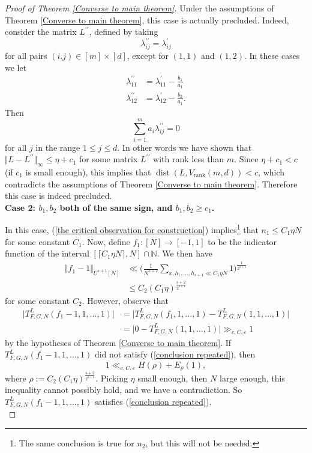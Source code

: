 \documentclass[12pt,a4paper,twoside,reqno]{amsart}
\newcommand{\rank}{\operatorname{rank}}
\numberwithin{equation}{section}
\begin{document}
\begin{proof}[Proof of Theorem \ref{Converse to main theorem}]
Under the assumptions of Theorem \ref{Converse to main theorem}, this case is actually precluded. Indeed, consider the matrix $L^{\prime\prime}$, defined by taking $$\lambda_{ij}^{\prime\prime} = \lambda_{ij}^\prime$$ for all pairs $(i.j)\in [m]\times[d]$, except for $(1,1)$ and $(1,2)$. In these cases we let 
\begin{align*}
\lambda_{11}^{\prime\prime} &= \lambda_{11}^\prime - \frac{b_1}{a_1}\\
\lambda_{12}^{\prime\prime} & = \lambda_{12}^\prime - \frac{b_2}{a_1}.
\end{align*}
Then $$\sum\limits_{i=1}^m a_i\lambda_{ij}^{\prime\prime} = 0$$ for all $j$ in the range $1\leqslant j\leqslant d$. In other words we have shown that $\Vert L-L^{\prime\prime}\Vert_{\infty} \leqslant \eta + c_1$ for some matrix $L^{\prime\prime}$ with rank less than $m$. Since $\eta + c_1< c$ (if $c_1$ is small enough), this implies that $\operatorname{dist}(L,V_{\rank}(m,d))<c$, which contradicts the assumptions of Theorem \ref{Converse to main theorem}. Therefore this case is indeed precluded. \\


\noindent \textbf{Case 2: $b_1,b_2$ both of the same sign, and $b_1,b_2\geqslant c_1$.}

In this case, (\ref{the critical observation for construction}) implies\footnote{The same conclusion is true for $n_2$, but this will not be needed.} that $n_1\leqslant C_1\eta N$ for some constant $C_1$. Now, define $f_1:[N]\longrightarrow [-1,1]$ to be the indicator function of the interval $[\lceil C_1\eta N\rceil, N]\cap \mathbb{N}$. We then have 
\begin{align*}
\Vert f_1 - 1\Vert_{U^{s+1}[N]} &\ll \Big(\frac{1}{N^{s+2}} \sum\limits_{x,h_1,\dots,h_{s+1}\ll C_1\eta N} 1\Big)^{\frac{1}{2^{s+1}}}\\
&\leqslant C_2(C_1\eta)^{\frac{s+2}{2^{s+1}}}
\end{align*}
\noindent for some constant $C_2$. However, observe that 
\begin{align*}
\vert T_{F,G,N}^L(f_1-1,1,\dots,1)\vert &= \vert T_{F,G,N}^L(f_1,1,\dots,1) - T_{F,G,N}^L(1,1,\dots,1)\vert\\
& = \vert 0 - T_{F,G,N}^L(1,1,\dots,1)\vert
\gg_{c,C,\varepsilon} 1
\end{align*}
\noindent by the hypotheses of Theorem \ref{Converse to main theorem}. If $T_{F,G,N}^L(f_1 - 1,1,\dots,1)$ did not satisfy (\ref{conclusion repeated}), then $$1 \ll_{c,C,\varepsilon} H(\rho) + E_{\rho}(1),$$ where $\rho := C_2(C_1\eta)^{\frac{s+2}{2^{s+1}}}$. Picking $\eta$ small enough, then $N$ large enough, this inequality cannot possibly hold, and we have a contradiction. So $T_{F,G,N}^L(f_1 - 1,1,\dots,1)$ satisfies (\ref{conclusion repeated}). \\


\end{proof}
\end{document}
